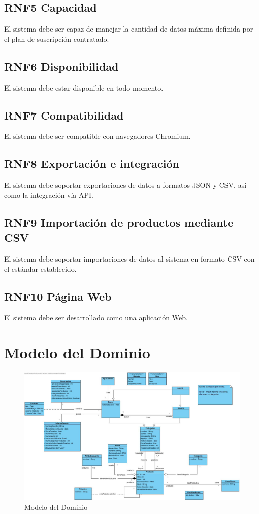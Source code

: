 \documentclass[12pt.a4paper]{article}
\begin{document}
\subsection*{RNF5 Capacidad}
El sistema debe ser capaz de manejar la cantidad de datos máxima definida por el plan de suscripción contratado.

\subsection*{RNF6 Disponibilidad}
El sistema debe estar disponible en todo momento.

\subsection*{RNF7 Compatibilidad}
El sistema debe ser compatible con navegadores Chromium.

\subsection*{RNF8 Exportación e integración}
El sistema debe soportar exportaciones de datos a formatos JSON y CSV, así como la integración vía API.

\subsection*{RNF9 Importación de productos mediante CSV}
El sistema debe soportar importaciones de datos al sistema en formato CSV con el estándar establecido.


\subsection*{RNF10 Página Web}
El sistema debe ser desarrollado como una aplicación Web.

\section{Modelo del Dominio}

\begin{figure}[h]   
    \centering
    \includegraphics[width=1\textwidth]{modelo.jpg}
    \caption{Modelo del Dominio}
    \label{fig:mi_imagen}
\end{figure}
\end{document}
